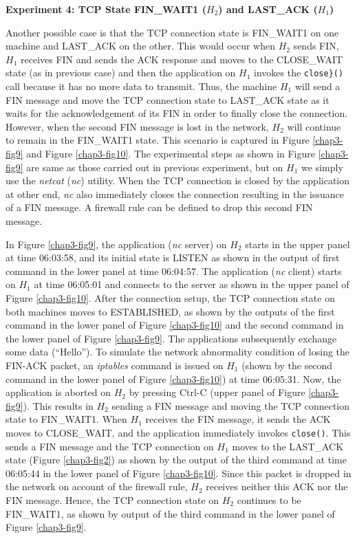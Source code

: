 \begin{multicols}{2}
\noindent
\textbf{Experiment 4: TCP State FIN\_WAIT1 (\boldmath$H_{2}$) and LAST\_ACK ($H_{1}$)}
\smallskip

Another possible case is that the TCP connection state is FIN\_WAIT1 on one machine and LAST\_ACK on the other. This would occur when $H_{2}$ sends FIN, $H_{1}$ receives FIN and sends the ACK response and moves to the CLOSE\_WAIT state (as in previous case) and then the application on $H_{1}$ invokes the \lstinline|close}()| call because it has no more data to transmit. Thus, the machine $H_{1}$ will send a FIN message and move the TCP connection state to LAST\_ACK state as it waits for the acknowledgement of its FIN in order to finally close the connection. However, when the second FIN message is lost in the network, $H_{2}$ will continue to remain in the FIN\_WAIT1 state. This scenario is captured in Figure \ref{chap3-fig9} and Figure \ref{chap3-fig10}. The experimental steps as shown in Figure \ref{chap3-fig9} are same as those carried out in previous experiment, but on $H_{1}$ we simply use the \textit{netcat} (\textit{nc}) utility. When the TCP connection is closed by the application at other end, \textit{nc} also immediately closes the connection resulting in the issuance of a FIN message. A firewall rule can be defined to drop this second FIN message.

In Figure \ref{chap3-fig9}, the application (\textit{nc} server) on $H_{2}$ starts in the upper panel at time 06:03:58, and its initial state is LISTEN as shown in the output of first command in the lower panel at time 06:04:57. The application (\textit{nc} client) starts on $H_{1}$ at time 06:05:01 and connects to the server as shown in the upper panel of Figure \ref{chap3-fig10}. After the connection setup, the TCP connection state on both machines moves to ESTABLISHED, as shown by the outputs of the first command in the lower panel of Figure \ref{chap3-fig10} and the second command in the lower panel of Figure \ref{chap3-fig9}. The applications subsequently exchange some data (``Hello''). To simulate the network abnormality condition of losing the FIN-ACK packet, an \textit{iptables} command is issued on $H_{1}$ (shown by the second command in the lower panel of Figure \ref{chap3-fig10}) at time 06:05:31. Now, the application is aborted on $H_{2}$ by pressing Ctrl-C (upper panel of Figure \ref{chap3-fig9}). This results in $H_{2}$ sending a FIN message and moving the TCP connection state to FIN\_WAIT1. When $H_{1}$ receives the FIN message, it sends the ACK moves to CLOSE\_WAIT, and the application immediately invokes \lstinline|close()|. This sends a FIN message and the TCP connection on $H_{1}$ moves to the LAST\_ACK state (Figure \ref{chap3-fig2}) as shown by the output of the third command at time 06:05:44 in the lower panel of Figure \ref{chap3-fig10}. Since this packet is dropped in the network on account of the firewall rule, $H_{2}$ receives neither this ACK nor the FIN message. Hence, the TCP connection state on $H_{2}$ continues to be FIN\_WAIT1, as shown by output of the third command in the lower panel of Figure \ref{chap3-fig9}.


\end{multicols}
